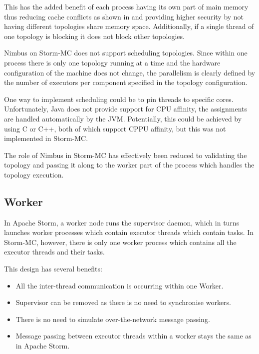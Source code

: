 This has the added benefit of each process having its own part of main memory thus reducing cache conflicts as shown in \cite{Chandra:2005:PIC:1042442.1043432} and providing higher security by not having different topologies share memory space. Additionally, if a single thread of one topology is blocking it does not block other topologies.

Nimbus on Storm-MC does not support scheduling topologies. Since within one process there is only one topology running at a time and the hardware configuration of the machine does not change, the parallelism is clearly defined by the number of executors per component specified in the topology configuration.

One way to implement scheduling could be to pin threads to specific cores. Unfortunately, Java does not provide support for CPU affinity, the assignments are handled automatically by the JVM. Potentially, this could be achieved by using C or C++, both of which support CPPU affinity, but this was not implemented in Storm-MC.


The role of Nimbus in Storm-MC has effectively been reduced to validating the topology and passing it along to the worker part of the process which handles the topology execution.

\subsection{Worker}

In Apache Storm, a worker node runs the supervisor daemon, which in turns launches worker processes which contain executor threads which contain tasks. In Storm-MC, however, there is only one worker process which contains all the executor threads and their tasks.

This design has several benefits:

\begin{itemize}
	\item All the inter-thread communication is occurring within one Worker.
	\item Supervisor can be removed as there is no need to synchronise workers.
	\item There is no need to simulate over-the-network message passing.
	\item Message passing between executor threads within a worker stays the same as in Apache Storm.
\end{itemize}

